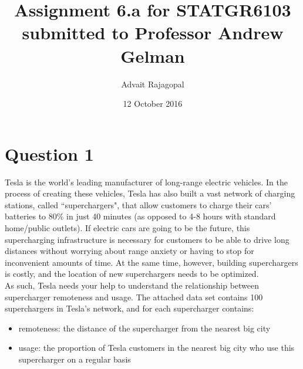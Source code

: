 \documentclass{article}
\title{Assignment 6.a for \textbf{STATGR6103}\\
\large submitted to Professor Andrew Gelman}
\date{12 October 2016}
\author{Advait Rajagopal}
\begin{document}
  \maketitle
\section{Question 1}
Tesla is the world's leading manufacturer of long-range electric vehicles. In the process of creating these vehicles, Tesla has also built a vast network of charging stations, called ``superchargers", that allow customers to charge their cars' batteries to 80\% in just 40 minutes (as opposed to 4-8 hours with standard home/public outlets). If electric cars are going to be the future, this supercharging infrastructure is necessary for customers to be able to drive long distances without worrying about range anxiety or having to stop for inconvenient amounts of time. At the same time, however, building superchargers is costly, and the location of new superchargers needs to be optimized.\\
As such, Tesla needs your help to understand the relationship between supercharger remoteness and usage. The attached data set contains 100 superchargers in Tesla's network, and for each supercharger contains:
\begin{itemize}
\item{remoteness: the distance of the supercharger from the nearest big city}
\item{usage: the proportion of Tesla customers in the nearest big city who use this supercharger on a regular basis}
\end{itemize}
\end{document}
